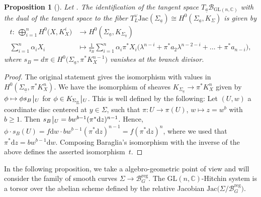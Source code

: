 \documentclass[10pt,a4paper]{amsart}
\numberwithin{equation}{section}
\newtheorem{prop}[theo]{Proposition}
\theoremstyle{definition}
\newcommand{\reg}{\mathrm{reg}}
\newcommand{\Jac}{\mathrm{Jac}}
\newcommand{\rest}{\: \rule[-3.5pt]{0.5pt}{11.5pt}\,{}}
\renewcommand{\to}{\rightarrow}
\newcommand{\calB}{\mathcal{B}}
\newcommand{\CC}{\mathbb{C}}
\renewcommand{\d}{\mathrm{d}}
\newcommand{\GL}{\mathrm{GL}}
\begin{document}
\begin{prop}[{\cite[Proposition~3.4]{Baraglia}}]\label{prop:Baraglia}
 Let \smash{$\underline{a} \in \calB_{\GL(n,\CC)}^\reg$}. The identification of the tangent space $T_{\underline{a}}\calB_{\GL(n,\CC)}$ with the dual of the tangent space to the fiber $T^\vee_L\Jac(\Sigma_{\underline{a}}) \cong H^0(\Sigma_{\underline{a}},K_\Sigma)$ is given by
 \begin{align*}
 t\colon \ \bigoplus\limits_{i=1}^n H^0\bigl(X,K_X^i\bigr) & \to H^0(\Sigma_{\underline{a}},K_{\Sigma_{\underline{a}}})
 \\
\sum\limits_{i=1}^n \alpha_i X_i & \mapsto \frac{1}{s_B} \sum\limits_{i=1}^n \alpha_i \pi^*X_i\bigl(\lambda^{n-i}+\pi^*a_2 \lambda^{n-2-i}+ \dots + \pi^*a_{n-i}\bigr),
 \end{align*}
 where $s_B=d \pi \in H^0\bigl(\Sigma_{\underline{a}},\pi^*K_X^{n-1}\bigr)$ vanishes at the branch divisor.
\end{prop}
\begin{proof}
 The original statement gives the isomorphism with values in $H^0(\Sigma_{\underline{a}},\pi^*K_X^n)$. We have the isomorphism of sheaves $K_{\Sigma_{\underline{a}}} \to \pi^*K_X^n$ given by $ \phi \mapsto \phi s_B\rest_U$ for $\phi \in K_{\Sigma_{\underline{a}}}\rest_U$. This is well defined by the following: Let $(U,w)$ a coordinate disc centered at $y \in \Sigma$, such that $\pi\colon U \to \pi(U)$, $w \mapsto z=w^b$ with $b \geq 1$. Then $s_B\rest_U= b w^{b-1} (\pi^* \d z)^{n-1}$. Hence, $\phi \cdot s_B(U)=f \d w \cdot b w^{b-1} (\pi^* \d z)^{n-1}=f (\pi^* \d z)^{n}$, where we used that $\pi^* \d z= b w^{b-1} \d w$. Composing Baraglia's isomorphism \cite[Proposition~3.4]{Baraglia} with the inverse of the above defines the asserted isomorphism~$t$.
\end{proof}

In the following proposition, we take a algebro-geometric point of view and will consider the family of smooth curves $\Sigma \to \calB_G^\reg$. The $\GL(n,\CC)$-Hitchin system is a torsor over the abelian scheme defined by the relative Jacobian $\Jac\bigl(\Sigma/\calB_G^\reg\bigr)$.
\end{document}
